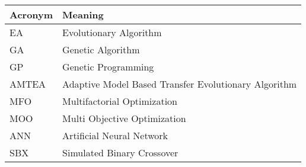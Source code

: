 \fontsize{13}{16}
\selectfont
\begin{center}
	\begin{tabular}{|p{1in}|p{5in}|}
		\hline
		\textbf{Acronym} & \textbf{Meaning}  \\ \hline
		EA & Evolutionary Algorithm	\\ \hline
		GA & Genetic Algorithm \\ \hline
		GP & Genetic Programming \\ \hline
		AMTEA & Adaptive Model Based Transfer Evolutionary Algorithm \\ \hline
		MFO & Multifactorial Optimization  \\ \hline
		MOO & Multi Objective Optimization \\ \hline
		ANN & Artificial Neural Network \\ \hline
		SBX & Simulated Binary Crossover\\ \hline
	\end{tabular}    
\end{center}


\pagebreak